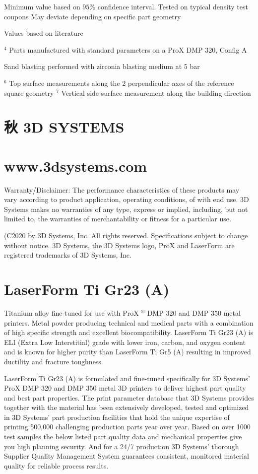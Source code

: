 \documentclass[10pt]{article}
\begin{document}
Minimum value based on $95 \%$ confidence interval. Tested on typical density test coupons May deviate depending on specific part geometry

Values based on literature

${ }^{4}$ Parts manufactured with standard parameters on a ProX DMP 320, Config A

Sand blasting performed with zirconia blasting medium at 5 bar

${ }^{6}$ Top surface measurements along the 2 perpendicular axes of the reference square geometry ${ }^{7}$ Vertical side surface measurement along the building direction

\section*{秋 3D SYSTEMS}
\section*{www.3dsystems.com}
Warranty/Disclaimer: The performance characteristics of these products may vary according to product application, operating conditions, of with end use. 3D Systems makes no warranties of any type, express or implied, including, but not limited to, the warranties of merchantability or fitness for a particular use.

(C2020 by 3D Systems, Inc. All rights reserved. Specifications subject to change without notice. 3D Systems, the 3D Systems logo, ProX and LaserForm are registered trademarks of 3D Systems, Inc.

\section*{LaserForm Ti Gr23 (A)}
Titanium alloy fine-tuned for use with ProX ${ }^{\circledR}$ DMP 320 and DMP 350 metal printers. Metal powder producing technical and medical parts with a combination of high specific strength and excellent biocompatibility. LaserForm Ti Gr23 (A) is ELI (Extra Low Interstitial) grade with lower iron, carbon, and oxygen content and is known for higher purity than LaserForm Ti Gr5 (A) resulting in improved ductility and fracture toughness.

LaserForm Ti Gr23 (A) is formulated and fine-tuned specifically for 3D Systems' ProX DMP 320 and DMP 350 metal 3D printers to deliver highest part quality and best part properties. The print parameter database that 3D Systems provides together with the material has been extensively developed, tested and optimized in 3D Systems' part production facilities that hold the unique expertise of printing 500,000 challenging production parts year over year. Based on over 1000 test samples the below listed part quality data and mechanical properties give you high planning security. And for a 24/7 production 3D Systems' thorough Supplier Quality Management System guarantees consistent, monitored material quality for reliable process results.
\end{document}
